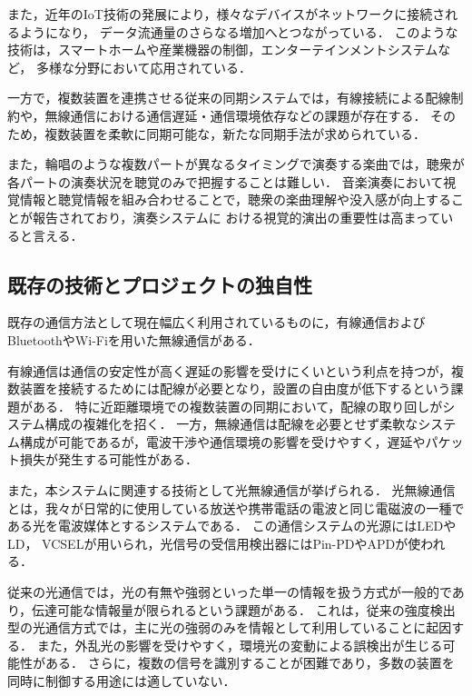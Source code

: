 \documentclass[lualatex,book,openany,paper=a4paper,jafontsize=11.5pt,jafontscale=1.05]{jlreq}
\begin{document}
また，近年のIoT技術の発展により，様々なデバイスがネットワークに接続されるようになり，
データ流通量のさらなる増加へとつながっている\cite{IoT}．
このような技術は，スマートホームや産業機器の制御，エンターテインメントシステムなど，
多様な分野において応用されている．


一方で，複数装置を連携させる従来の同期システムでは，有線接続による配線制約や，無線通信における通信遅延・通信環境依存などの課題が存在する．
そのため，複数装置を柔軟に同期可能な，新たな同期手法が求められている．


また，輪唱のような複数パートが異なるタイミングで演奏する楽曲では，聴衆が各パートの演奏状況を聴覚のみで把握することは難しい．
音楽演奏において視覚情報と聴覚情報を組み合わせることで，聴衆の楽曲理解や没入感が向上することが報告されており\cite{視覚聴覚}，演奏システムに
おける視覚的演出の重要性は高まっていると言える．

\subsection{既存の技術とプロジェクトの独自性}

既存の通信方法として現在幅広く利用されているものに，有線通信およびBluetoothやWi-Fiを用いた無線通信がある．

有線通信は通信の安定性が高く遅延の影響を受けにくいという利点を持つが，複数装置を接続するためには配線が必要となり，設置の自由度が低下するという課題がある．
特に近距離環境での複数装置の同期において，配線の取り回しがシステム構成の複雑化を招く．
一方，無線通信は配線を必要とせず柔軟なシステム構成が可能であるが，電波干渉や通信環境の影響を受けやすく，遅延やパケット損失が発生する可能性がある\cite{無線}．


また，本システムに関連する技術として光無線通信が挙げられる．
光無線通信とは，我々が日常的に使用している放送や携帯電話の電波と同じ電磁波の一種である光を電波媒体とするシステムである\cite{光無線通信}．
この通信システムの光源にはLEDやLD， VCSELが用いられ，光信号の受信用検出器にはPin-PDやAPDが使われる．


従来の光通信では，光の有無や強弱といった単一の情報を扱う方式が一般的であり，伝達可能な情報量が限られるという課題がある．
これは，従来の強度検出型の光通信方式では，主に光の強弱のみを情報として利用していることに起因する．
また，外乱光の影響を受けやすく，環境光の変動による誤検出が生じる可能性がある．
さらに，複数の信号を識別することが困難であり，多数の装置を同時に制御する用途には適していない．
\end{document}
